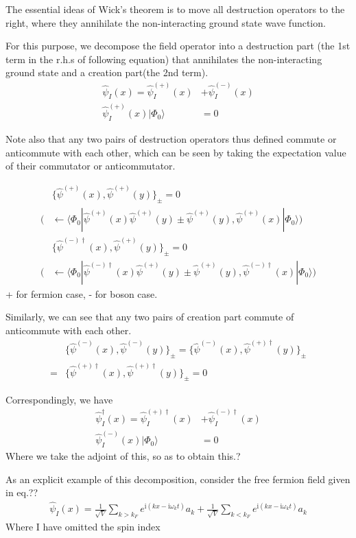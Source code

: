 The essential ideas of Wick's theorem is to move all destruction operators to the right, where they annihilate the non-interacting ground state wave function.

For this purpose, we decompose the field operator into a destruction part (the 1st term in the r.h.s of following equation) that annihilates the non-interacting ground state and a creation part(the 2nd term).
\begin{align}
\hat \psi_{I}(x)=\hat \psi^{(+)}_{I}(x)&+\hat \psi^{(-)}_{I}(x) \nonumber \\
\hat \psi^{(+)}_{I}(x)|\Phi_0\rangle&=0 \nonumber
\end{align}

Note also that any two pairs of destruction operators thus defined commute or anticommute with each other, which can be seen by taking the expectation value of their commutator or anticommutator.

\begin{align}
&\{\hat \psi^{(+)}(x),\hat \psi^{(+)}(y)\}_{\pm}=0 \nonumber \\
\big (&\leftarrow\langle\Phi_0|\hat \psi^{(+)}(x)\hat \psi^{(+)}(y)\pm\hat \psi^{(+)}(y),\hat \psi^{(+)}(x)|\Phi_0\rangle \big) \nonumber \\
&\{\hat \psi^{(-)\dagger}(x),\hat \psi^{(+)}(y)\}_{\pm}=0 \nonumber \\
\big (&\leftarrow\langle\Phi_0|\hat \psi^{(-)\dagger}(x)\hat \psi^{(+)}(y)\pm\hat \psi^{(+)}(y),\hat \psi^{(-)\dagger}(x)|\Phi_0\rangle \big) \nonumber
\end{align} 
+ for fermion case, - for boson case.

Similarly, we can see that any two pairs of creation part commute of anticommute with each other.
\begin{align}
&\{\hat \psi^{(-)}(x),\hat \psi^{(-)}(y)\}_{\pm}=\{\hat \psi^{(-)}(x),\hat \psi^{(+)\dagger}(y)\}_{\pm} \nonumber \\
=&\{\hat \psi^{(+)\dagger}(x),\hat \psi^{(+)\dagger}(y)\}_{\pm}=0 \nonumber 
\end{align}

Correspondingly, we have
\begin{align}
\hat \psi^{\dagger}_{I}(x)=\hat \psi^{(+)\dagger}_{I}(x)&+\hat \psi^{(-)\dagger}_{I}(x) \nonumber \\
\hat \psi^{(-)}_{I}(x)|\Phi_0\rangle&=0 \nonumber
\end{align}
Where we take the adjoint of this, so as to obtain this.?

As an explicit example of this decomposition, consider the free fermion field given in eq.??
\begin{align}
\hat \psi_I(x)=\frac{1}{\sqrt{V}}\sum_{k>k_F} e^{\mathrm{i}(kx-\mathrm{i}\omega_kt)}a_k+\frac{1}{\sqrt{V}}\sum_{k<k_F} e^{\mathrm{i}(kx-\mathrm{i}\omega_kt)}a_k \nonumber
\end{align}
Where I have omitted the spin index

